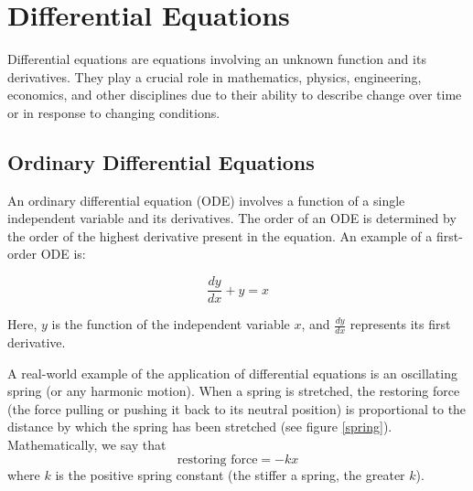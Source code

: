 \chapter{Differential Equations}

Differential equations are equations involving an unknown function and
its derivatives. They play a crucial role in mathematics, physics,
engineering, economics, and other disciplines due to their ability to
describe change over time or in response to changing conditions.

\section{Ordinary Differential Equations}

An ordinary differential equation (ODE) involves a function of a
single independent variable and its derivatives. The order of an ODE
is determined by the order of the highest derivative present in the
equation. An example of a first-order ODE is: 

\begin{equation}
\frac{dy}{dx} + y = x
\end{equation}

Here, $y$ is the function of the independent variable $x$, and 
$\frac{dy}{dx}$ represents its first derivative.

A real-world example of the application of differential equations is an 
oscillating spring (or any harmonic motion). When a spring is stretched, the 
restoring force (the force pulling or pushing it back to its neutral position) 
is proportional to the distance by which the spring has been stretched (see 
figure \ref{spring}). Mathematically, we say that
$$\text{restoring force} = -kx$$
where $k$ is the positive spring constant (the stiffer a spring, the greater 
$k$). 

